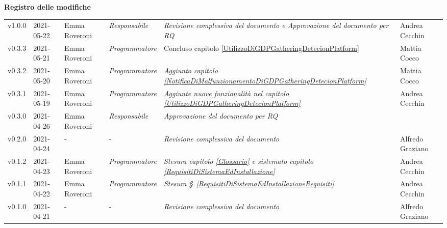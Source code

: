 \quad
\begin{center}
	\LARGE\textbf{Registro delle modifiche}
\end{center}
\def\tabularxcolumn#1{m{#1}}
{

	\begin{center}
		\renewcommand{\arraystretch}{1.4}
		\begin{longtable}[c]{|p{2cm-1\tabcolsep}|p{2cm}|p{3cm-2\tabcolsep}|p{3cm-1.5\tabcolsep}|p{}|p{}|}
			\hline
			\rowcolor{airforceblue}
			\makecell[c]{\textbf{Versione}} & \makecell[c]{\textbf{Data}} & \makecell[c]{\textbf{Autore}} & \makecell[c]{\textbf{Ruolo}} & \makecell[c]{\textbf{Modifica}} & \makecell[c]{\textbf{Verificatore}}\\
			\hline
			\centering v1.0.0 & 2021-05-22 & Emma Roveroni & \textit{Responsabile}  & \textit{Revisione complessiva del documento e Approvazione del documento per RQ} & Andrea Cecchin \\
			\hline
			\centering v0.3.3 & 2021-05-21 & Emma Roveroni & \textit{Programmatore}  & Concluso capitolo \ref{UtilizzoDiGDPGatheringDetecionPlatform} & Mattia Cocco \\
			\hline
			\centering v0.3.2 & 2021-05-20 & Emma Roveroni & \textit{Programmatore}  & \textit{Aggiunto capitolo \ref{NotificaDiMalfunzionamentoDiGDPGatheringDetecionPlatform}} & Mattia Cocco \\
			\hline
			\centering v0.3.1 & 2021-05-19 & Emma Roveroni & \textit{Programmatore}  & \textit{Aggiunte nuove funzionalità nel capitolo \ref{UtilizzoDiGDPGatheringDetecionPlatform}} & Andrea Cecchin \\
			\hline
			\centering v0.3.0 & 2021-04-26 & Emma Roveroni & \textit{Responsabile}  & \textit{Approvazione del documento per RQ} & \makecell[c]{-} \\
			\hline
			\centering v0.2.0 & 2021-04-24 & \centering - & \centering-  & \textit{Revisione complessiva del documento} & Alfredo Graziano \\
			\hline
			\centering v0.1.2 & 2021-04-23 & Emma Roveroni & \textit{Programmatore} & \textit{Stesura capitolo \ref{Glossario} e sistemato capitolo \ref{RequisitiDiSistemaEdInstallazione} } & Andrea Cecchin \\
			\centering v0.1.1 & 2021-04-22 & Emma Roveroni & \textit{Programmatore} & \textit{Stesura \S~\ref{RequisitiDiSistemaEdInstallazioneRequisiti}} & Andrea Cecchin \\
			\hline
			\centering v0.1.0 & 2021-04-21 & \centering - & \centering-  & \textit{Revisione complessiva del documento} & Alfredo Graziano \\

\end{longtable}
\end{center}}
